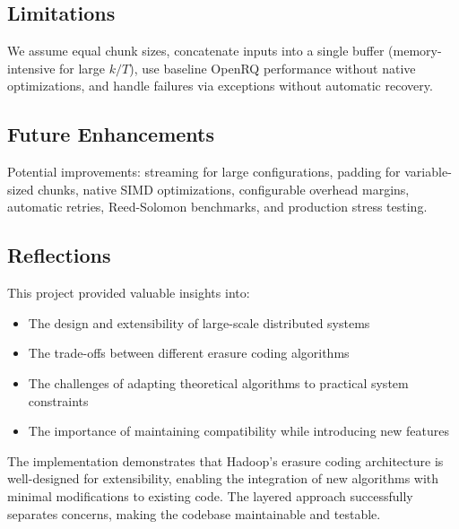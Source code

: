 \documentclass{article}
\begin{document}
\subsection{Limitations}

We assume equal chunk sizes, concatenate inputs into a single buffer (memory-intensive for large $k/T$), use baseline OpenRQ performance without native optimizations, and handle failures via exceptions without automatic recovery.

\subsection{Future Enhancements}

Potential improvements: streaming for large configurations, padding for variable-sized chunks, native SIMD optimizations, configurable overhead margins, automatic retries, Reed-Solomon benchmarks, and production stress testing.

\subsection{Reflections}

This project provided valuable insights into:
\begin{itemize}
\item The design and extensibility of large-scale distributed systems
\item The trade-offs between different erasure coding algorithms
\item The challenges of adapting theoretical algorithms to practical system constraints
\item The importance of maintaining compatibility while introducing new features
\end{itemize}

The implementation demonstrates that Hadoop's erasure coding architecture is well-designed for extensibility, enabling the integration of new algorithms with minimal modifications to existing code. The layered approach successfully separates concerns, making the codebase maintainable and testable.
%
%
\end{document}
